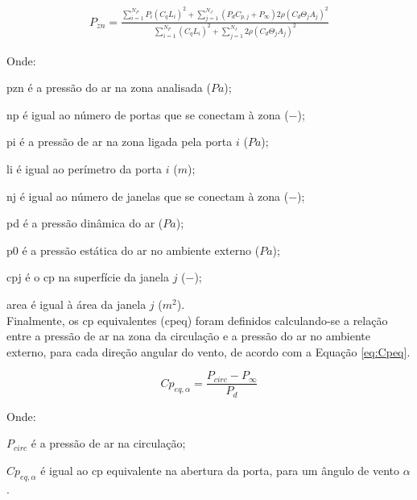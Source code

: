 \documentclass[brazil,hardcopy,openany]{ufscthesis} %
\begin{document}
\begin{equation}\label{eq:P}
\begin{split}
P_{zn} = \frac{\sum_{i=1}^{N_P}{P_{i} (C_q L_i)^2} +  %
	\sum_{j=1}^{N_J}{(P_{d} C_{p,j} + P_{\infty}) 2 \rho (C_{d} \Theta_j A_j)^2 }}
{\sum_{i=1}^{N_P}{(C_q L_i)^2} +  %
	\sum_{j=1}^{N_J}{2 \rho (C_{d} \Theta_j A_j)^2 }}
\end{split}
\end{equation}

Onde:

\gls{pzn} é a pressão do ar na zona analisada ($Pa$);

\gls{np} é igual ao número de portas que se conectam à zona ($-$);

\gls{pi} é a pressão de ar na zona ligada pela porta $i$ ($Pa$);

\gls{li} é igual ao perímetro da porta $i$ ($m$);

\gls{nj} é igual ao número de janelas que se conectam à zona ($-$);

\gls{pd} é a pressão dinâmica do ar ($Pa$);

\gls{p0} é a pressão estática do ar no ambiente externo ($Pa$);

\gls{cpj} é o \acrshort{cp} na superfície da janela $j$ ($-$);

\gls{area} é igual à área da janela $j$ ($m^2$).
\\

Finalmente, os \acrshort{cp} equivalentes (\acrshort{cpeq}) foram definidos calculando-se a relação entre a pressão de ar na zona da circulação e a pressão do ar no ambiente externo, para cada direção angular do vento, de acordo com a Equação \ref{eq:Cpeq}.

\begin{equation}\label{eq:Cpeq}
Cp_{eq,\alpha} = \frac{P_{circ}-P_{\infty}}{P_{d}}
\end{equation}

Onde:

$P_{circ}$ é a pressão de ar na circulação;

$Cp_{eq,\alpha}$ é igual ao \acrshort{cp} equivalente na abertura da porta, para um ângulo de vento $\alpha$.
\\
\end{document}
